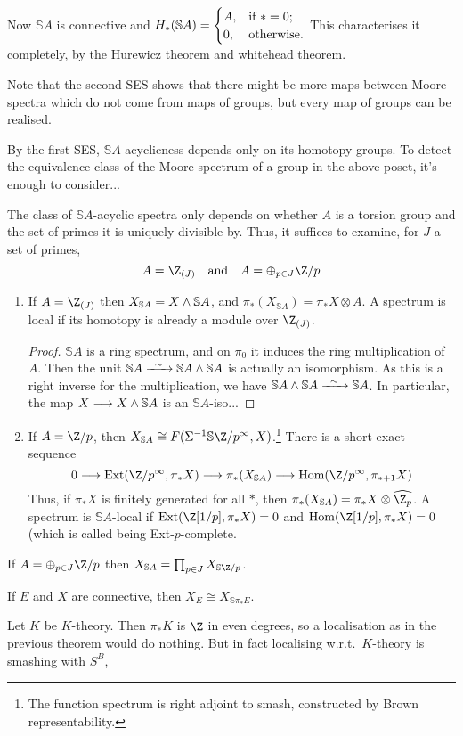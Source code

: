 \documentclass[11pt]{article}
\begin{document}
\begin{MarkusLocalisationPractice}
\begin{exmp*}
Now $\mathbb{S}A$ is connective and $H_*(\mathbb{S}A)=\begin{cases}
A,&\textup{if }*=0;\\
0,&\textup{otherwise}.
\end{cases}$ This characterises it completely, by the Hurewicz theorem and whitehead theorem.

Note that the second SES shows that there might be more maps between Moore spectra which do not come from maps of groups, but every map of groups can be realised.
\end{exmp*}
By the first SES, $\mathbb{S}A$-acyclicness depends only on its homotopy groups. To detect the equivalence class of the Moore spectrum of a group in the above poset, it's enough to consider...

The class of $\mathbb{S}A$-acyclic spectra only depends on whether $A$ is a torsion group and the set of primes it is uniquely divisible by. Thus, it suffices to examine, for $J$ a set of primes,
\[A=\Z_{(J)}\textup{\quad and\quad }A=\oplus_{p\in J}\Z/p\]
\begin{enumerate}\squishlist
\item If $A=\Z_{(J)}$ then $X_{\mathbb{S}A}=X\wedge \mathbb{S}A$, and $\pi_*(X_{\mathbb{S}A})=\pi_*X\otimes A$. A spectrum is local if its homotopy is already a module over $\Z_{(J)}$.
\begin{proof}
$\mathbb{S}A$ is a ring spectrum, and on $\pi_0$ it induces the ring multiplication of $A$. Then the unit $\mathbb{S}A\weakequiv\mathbb{S}A\sprod\mathbb{S}A$ is actually an isomorphism. As this is a right inverse for the multiplication, we have $\mathbb{S}A\sprod\mathbb{S}A\weakequiv\mathbb{S}A$. In particular, the map $X\longrightarrow X\wedge \mathbb{S}A$ is an $\mathbb{S}A$-iso...
\end{proof}
\item If $A=\Z/p$, then $X_{\mathbb{S}A}\cong F(\Sigma^{-1}\mathbb{S}\Z/p^\infty,X)$.\footnote{The function spectrum is right adjoint to smash, constructed by Brown representability.} There is a short exact sequence
\[0\to\Ext(\Z/p^\infty,\pi_{*}X)\to\pi_*(X_{\mathbb{S}A})\to\Hom(\Z/p^\infty,\pi_{*+1}X)\]
Thus, if $\pi_*X$ is finitely generated for all $*$, then $\pi_*(X_{\mathbb{S}A})=\pi_{*}X\otimes\widehat{\Z_p}$.
A spectrum is $\mathbb{S}A$-local if $\Ext(\Z[1/p],\pi_*X)=0$ and $\Hom(\Z[1/p],\pi_*X)=0$ (which is called being Ext-$p$-complete.
\end{enumerate}
\begin{thm*}
If $A=\oplus_{p\in J}\Z/p$ then $X_{\mathbb{S}A}=\prod_{p\in J}X_{\mathbb{S}\Z/p}$.
\end{thm*}
\begin{thm*}
If $E$ and $X$ are connective, then $X_E\cong X_{\mathbb{S}\pi_*E}$.
\end{thm*}
\begin{defn*}
Let $K$ be $K$-theory. Then $\pi_*K$ is $\Z$ in even degrees, so a localisation as in the previous theorem would do nothing. But in fact localising w.r.t.\ $K$-theory is smashing with $S^B$, 
\end{defn*}


\pagebreak
\end{MarkusLocalisationPractice}
\end{document}
